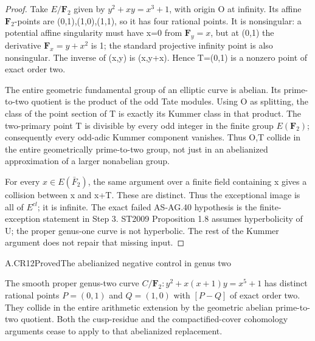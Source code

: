 \begin{proof}

Take \(E/\mathbf{F}_2\) given by \(y^2+xy=x^3+1\), with origin O at infinity. Its affine \(\mathbf{F}_2\)-points are (0,1),(1,0),(1,1), so it has four rational points. It is nonsingular: a potential affine singularity must have x=0 from \(\mathbf{F}_y=x\), but at (0,1) the derivative \(\mathbf{F}_x=y+x^2\) is 1; the standard projective infinity point is also nonsingular. The inverse of (x,y) is (x,y+x). Hence T=(0,1) is a nonzero point of exact order two.

The entire geometric fundamental group of an elliptic curve is abelian. Its prime-to-two quotient is the product of the odd Tate modules. Using O as splitting, the class of the point section of T is exactly its Kummer class in that product. The two-primary point T is divisible by every odd integer in the finite group \(E(\mathbf{F}_2)\); consequently every odd-adic Kummer component vanishes. Thus O,T collide in the entire geometrically prime-to-two group, not just in an abelianized approximation of a larger nonabelian group.

For every \(x\in E(\bar F_2)\), the same argument over a finite field containing x gives a collision between x and x+T. These are distinct. Thus the exceptional image is all of \(E^{cl}\); it is infinite. The exact failed AS-AG.40 hypothesis is the finite-exception statement in Step 3. ST2009 Proposition 1.8 assumes hyperbolicity of U; the proper genus-one curve is not hyperbolic. The rest of the Kummer argument does not repair that missing input.


\end{proof}

\begin{claim}{A.CR12}{Proved}{The abelianized negative control in genus two}

The smooth proper genus-two curve
$C/\mathbf F_2:y^2+x(x+1)y=x^5+1$ has distinct rational points
$P=(0,1)$ and $Q=(1,0)$ with $[P-Q]$ of exact order two. They
collide in the entire arithmetic extension by the geometric
abelian prime-to-two quotient. Both the cusp-residue and the
compactified-cover cohomology arguments cease to apply to that
abelianized replacement.

\end{claim}

